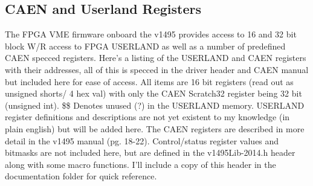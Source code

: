 \documentclass[11pt]{article}
\begin{document}
	\subsection{CAEN and Userland Registers}
The FPGA VME firmware onboard the v1495 provides access to 16 and 32 bit block W/R access to FPGA USERLAND as well as a number of predefined CAEN specced registers. Here's a listing of the USERLAND and CAEN registers with their addresses, all of this is specced in the driver header and CAEN manual but included here for ease of access. All items are 16 bit registers (read out as unsigned shorts/ 4 hex val) with only the CAEN Scratch32 register being 32 bit (unsigned int). \$\$ Denotes unused (?) in the USERLAND memory. USERLAND register definitions and descriptions are not yet existent to my knowledge (in plain english) but will be added here. The CAEN registers are described in more detail in the v1495 manual (pg. 18-22). Control/status register values and bitmasks are not included here, but are defined in the v1495Lib-2014.h header along with some macro functions. I'll include a copy of this header in the documentation folder for quick reference.
\end{document}
